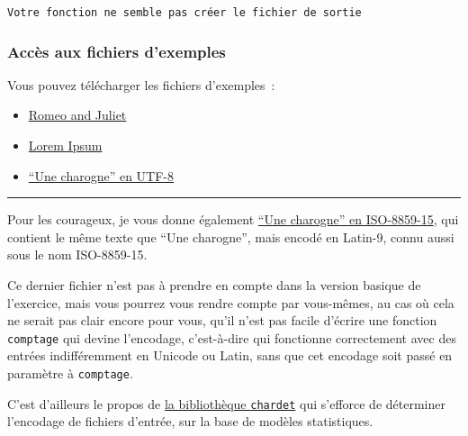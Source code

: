     \begin{Verbatim}[commandchars=\\\{\}]
Votre fonction ne semble pas créer le fichier de sortie

    \end{Verbatim}

    \hypertarget{accuxe8s-aux-fichiers-dexemples}{%
\subsubsection{Accès aux fichiers
d'exemples}\label{accuxe8s-aux-fichiers-dexemples}}

    Vous pouvez télécharger les fichiers d'exemples~:

\begin{itemize}
\tightlist
\item
  \href{data/romeo_and_juliet.txt}{Romeo and Juliet}
\item
  \href{data/lorem_ipsum.txt}{Lorem Ipsum}
\item
  \href{data/une_charogne_unicode.txt}{``Une charogne'' en UTF-8}
\end{itemize}

\begin{center}\rule{0.5\linewidth}{\linethickness}\end{center}

Pour les courageux, je vous donne également
\href{data/une_charogne_iso15.txt}{``Une charogne'' en ISO-8859-15}, qui
contient le même texte que ``Une charogne'', mais encodé en Latin-9,
connu aussi sous le nom ISO-8859-15.

Ce dernier fichier n'est pas à prendre en compte dans la version basique
de l'exercice, mais vous pourrez vous rendre compte par vous-mêmes, au
cas où cela ne serait pas clair encore pour vous, qu'il n'est pas facile
d'écrire une fonction \texttt{comptage} qui devine l'encodage,
c'est-à-dire qui fonctionne correctement avec des entrées indifféremment
en Unicode ou Latin, sans que cet encodage soit passé en paramètre à
\texttt{comptage}.

    C'est d'ailleurs le propos de
\href{https://pypi.python.org/pypi/chardet}{la bibliothèque
\texttt{chardet}} qui s'efforce de déterminer l'encodage de fichiers
d'entrée, sur la base de modèles statistiques.


    
    
    
